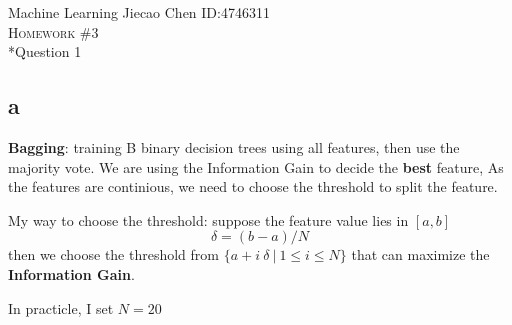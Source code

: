 \documentclass[12pt]{amsart}
\makeatletter
\renewcommand{\section}{\@startsection{section}{1}{0mm}
{-\baselineskip}{0.5\baselineskip}{\bf\leftline}}
\makeatother
\begin{document}
\noindent Machine Learning \hfill Jiecao Chen \hfill ID:4746311 \\
\textsc{Homework \#3}\\



\section*{Question 1} 
\subsection*{a}
\textbf{Bagging}: training B binary decision trees using all features,
then use the majority vote.
We are using the Information Gain to decide the \textbf{best} feature, 
As the features are continious, we need to choose the threshold to split the
feature.

My way to choose the threshold:
suppose the feature value lies in $[a, b]$
$$
	\delta = (b - a) / N
$$
then we choose the threshold from $\{ a + i ~ \delta ~|~ 1 \leq  i \leq N  \}$ that can
maximize the \textbf{Information Gain}.

In practicle, I set $N = 20$
\end{document}
